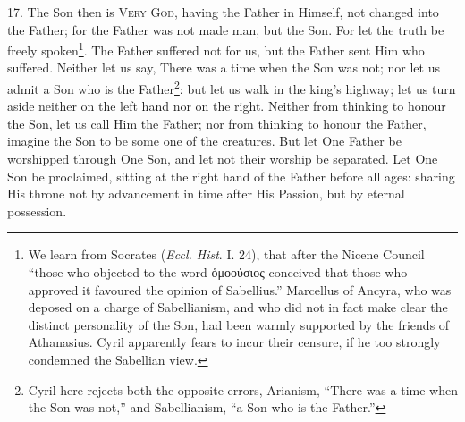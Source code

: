 17. The Son then is \textsc{Very God}, having the Father in Himself, not changed into the Father; for the Father was not made man, but the Son. For let the truth be freely spoken\footnote{We learn from Socrates (\emph{Eccl. Hist}. I. 24), that after the Nicene Council “those who objected to the word \textgreek{ὁμοούσιος} conceived that those who approved it favoured the opinion of Sabellius.” Marcellus of Ancyra, who was deposed on a charge of Sabellianism, and who did not in fact make clear the distinct personality of the Son, had been warmly supported by the friends of Athanasius. Cyril apparently fears to incur their censure, if he too strongly condemned the Sabellian view.}. The Father suffered not for us, but the Father sent Him who suffered. Neither let us say, There was a time when the Son was not; nor let us admit a Son who is the Father\footnote{Cyril here rejects both the opposite errors, Arianism, “There was a time when the Son was not,” and Sabellianism, “a Son who is the Father.”}: but let us walk in the king’s highway; let us turn aside neither on the left hand nor on the right. Neither from thinking to honour the Son, let us call Him the Father; nor from thinking to honour the Father, imagine the Son to be some one of the creatures. But let One Father be worshipped through One Son, and let not their worship be separated. Let One Son be proclaimed, sitting at the right hand of the Father before all ages: sharing His throne not by advancement in time after His Passion, but by eternal possession.

